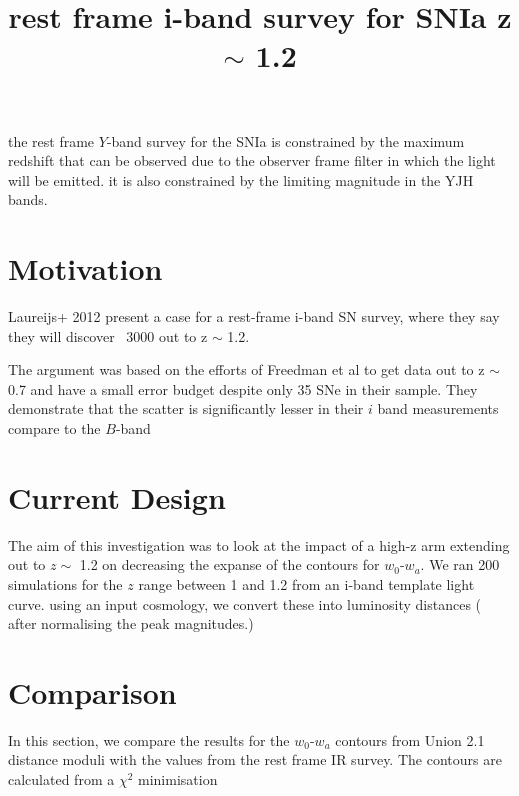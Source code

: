 \documentclass{article}
\begin{document}
\title{rest frame i-band survey for SNIa z $\sim$ 1.2}
\maketitle

the rest frame $Y$-band survey for the SNIa is constrained by the maximum redshift that can be observed due to the observer frame filter in which the light will be emitted. it is also constrained by 
the limiting magnitude in the YJH bands. 

\section{Motivation}
Laureijs+ 2012 present a case for a rest-frame i-band SN survey, where they say they will discover ~3000 out to z $\sim$ 1.2.




The argument was based on the efforts of Freedman et al to get data out to z $\sim$ 0.7 and have a small error budget despite only 35 SNe in their sample. They demonstrate that the scatter is significantly lesser in their $i$ band measurements compare to the $B$-band

\section{Current Design}
The aim of this investigation was to look at the impact of a high-z arm extending out to $z \sim$ 1.2 on decreasing the expanse of the contours for $w_0$-$w_a$. 
We ran 200 simulations for the $z$ range between 1 and 1.2 from an i-band template light curve. using an input cosmology, we convert these into luminosity distances ( after normalising the peak magnitudes.)

\section{Comparison}
In this section, we compare the results for the $w_0$-$w_a$ contours from Union 2.1 distance moduli with the values from the rest frame IR survey. 
The contours are calculated from a $\chi^2$ minimisation
\end{document}
